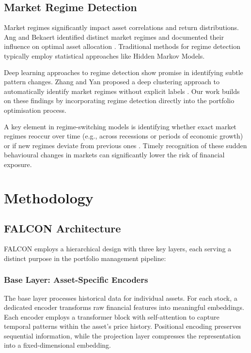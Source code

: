 \documentclass[conference]{IEEEtran}
\begin{document}
\subsection{Market Regime Detection}
Market regimes significantly impact asset correlations and return distributions. Ang and Bekaert identified distinct market regimes and documented their influence on optimal asset allocation \cite{ang2002international}. Traditional methods for regime detection typically employ statistical approaches like Hidden Markov Models.

Deep learning approaches to regime detection show promise in identifying subtle pattern changes. Zhang and Yan proposed a deep clustering approach to automatically identify market regimes without explicit labels \cite{zhang2020deep}. Our work builds on these findings by incorporating regime detection directly into the portfolio optimisation process.

A key element in regime-switching models is identifying whether exact market regimes reoccur over time (e.g., across recessions or periods of economic growth) or if new regimes deviate from previous ones \cite{ismail2023machine}. Timely recognition of these sudden behavioural changes in markets can significantly lower the risk of financial exposure.

\section{Methodology}

\subsection{FALCON Architecture}
FALCON employs a hierarchical design with three key layers, each serving a distinct purpose in the portfolio management pipeline:

\subsubsection{Base Layer: Asset-Specific Encoders}
The base layer processes historical data for individual assets. For each stock, a dedicated encoder transforms raw financial features into meaningful embeddings. Each encoder employs a transformer block with self-attention to capture temporal patterns within the asset's price history. Positional encoding preserves sequential information, while the projection layer compresses the representation into a fixed-dimensional embedding.
\end{document}
